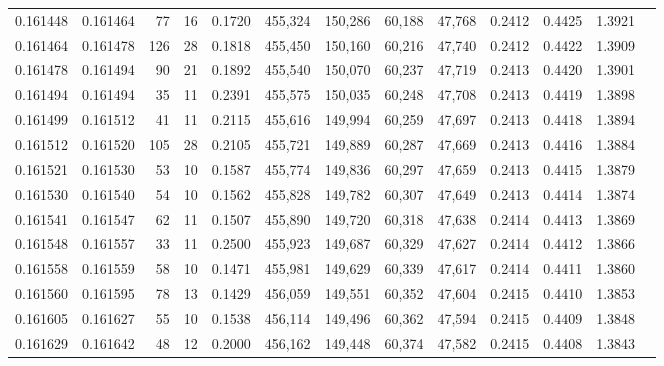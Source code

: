 \begin{tabular}{rrrrrrrrrrrrr}
0.161448 & 0.161464 &    77 &  16 &                                     0.1720 & 455,324 & 150,286 &  60,188 &  47,768 & 0.2412 & 0.4425 & 1.3921 \\
0.161464 & 0.161478 &   126 &  28 &                                     0.1818 & 455,450 & 150,160 &  60,216 &  47,740 & 0.2412 & 0.4422 & 1.3909 \\
0.161478 & 0.161494 &    90 &  21 &                                     0.1892 & 455,540 & 150,070 &  60,237 &  47,719 & 0.2413 & 0.4420 & 1.3901 \\
0.161494 & 0.161494 &    35 &  11 &                                     0.2391 & 455,575 & 150,035 &  60,248 &  47,708 & 0.2413 & 0.4419 & 1.3898 \\
0.161499 & 0.161512 &    41 &  11 &                                     0.2115 & 455,616 & 149,994 &  60,259 &  47,697 & 0.2413 & 0.4418 & 1.3894 \\
0.161512 & 0.161520 &   105 &  28 &                                     0.2105 & 455,721 & 149,889 &  60,287 &  47,669 & 0.2413 & 0.4416 & 1.3884 \\
0.161521 & 0.161530 &    53 &  10 &                                     0.1587 & 455,774 & 149,836 &  60,297 &  47,659 & 0.2413 & 0.4415 & 1.3879 \\
0.161530 & 0.161540 &    54 &  10 &                                     0.1562 & 455,828 & 149,782 &  60,307 &  47,649 & 0.2413 & 0.4414 & 1.3874 \\
0.161541 & 0.161547 &    62 &  11 &                                     0.1507 & 455,890 & 149,720 &  60,318 &  47,638 & 0.2414 & 0.4413 & 1.3869 \\
0.161548 & 0.161557 &    33 &  11 &                                     0.2500 & 455,923 & 149,687 &  60,329 &  47,627 & 0.2414 & 0.4412 & 1.3866 \\
0.161558 & 0.161559 &    58 &  10 &                                     0.1471 & 455,981 & 149,629 &  60,339 &  47,617 & 0.2414 & 0.4411 & 1.3860 \\
0.161560 & 0.161595 &    78 &  13 &                                     0.1429 & 456,059 & 149,551 &  60,352 &  47,604 & 0.2415 & 0.4410 & 1.3853 \\
0.161605 & 0.161627 &    55 &  10 &                                     0.1538 & 456,114 & 149,496 &  60,362 &  47,594 & 0.2415 & 0.4409 & 1.3848 \\
0.161629 & 0.161642 &    48 &  12 &                                     0.2000 & 456,162 & 149,448 &  60,374 &  47,582 & 0.2415 & 0.4408 & 1.3843 \\

\end{tabular}
